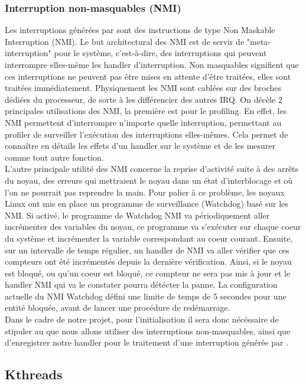 					\subsubsection{Interruption non-masquables (NMI)}
						Les interruptions générées par \IBS sont des instructions de type Non Maskable Interruption (NMI). Le but architectural des NMI est de servir de "meta-interruption" pour le système, c'est-à-dire, des interruptions qui peuvent interrompre elles-même les handler d'interruption. Non masquables signifient que ces interruptions ne peuvent pas être mises en attente d'être traitées, elles sont traitées immédiatement. Physiquement les NMI sont cablées sur des broches dédiées du processeur, de sorte à les différencier des autres IRQ. On décèle 2 principales utilisations des NMI, la première est pour le profiling. En effet, les NMI permettent d'interrompre n'importe quelle interruption, permettant au profiler de surveiller l'exécution des interruptions elles-mêmes. Cela permet de connaître en détails les effets d'un handler sur le système et de les mesurer comme tout autre fonction.\\
						L'autre principale utilité des NMI concerne la reprise d'activité suite à des arrêts du noyau, des erreurs qui mettraient le noyau dans un état d'interblocage et où l'on ne pourrait pas reprendre la main. Pour palier à ce problème, les noyaux Linux ont mis en place un programme de surveillance (Watchdog) basé sur les NMI. Si activé, le programme de Watchdog NMI va périodiquement aller incrémenter des variables du noyau, ce programme va s'exécuter sur chaque coeur du système et incrémenter la variable correspondant au coeur courant. Ensuite, sur un intervalle de temps régulier, un handler de NMI va aller vérifier que ces compteurs ont été incrémentés depuis la dernière vérification. Ainsi, si le noyau est bloqué, ou qu'un coeur est bloqué, ce compteur ne sera pas mis à jour et le handler NMI qui va le constater pourra détécter la panne. La configuration actuelle du NMI Watchdog défini une limite de temps de 5 secondes pour une entité bloquée, avant de lancer une procédure de redémarrage.\\
						Dans le cadre de notre projet, pour l'initialisation il sera donc nécéssaire de stipuler au \lap que nous allons utiliser des interruptions non-masquables, ainsi que d'enregistrer notre handler pour le traitement d'une interruption générée par \IBS.
				\subsection{Kthreads}

